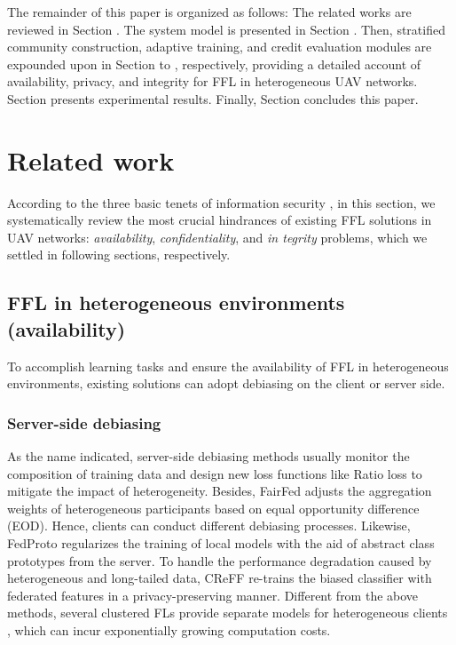 \documentclass[lettersize,journal]{IEEEtran}
\begin{document}
The remainder of this paper is organized as follows: The related works are reviewed in Section \uppercase\expandafter{}. The system model is presented in Section \uppercase\expandafter{}. Then, stratified community construction, adaptive training, and credit evaluation modules are expounded upon in Section \uppercase\expandafter{} to \uppercase\expandafter{}, respectively, providing a detailed account of availability, privacy, and integrity for FFL in heterogeneous UAV networks. Section \uppercase\expandafter{} presents experimental results. Finally, Section \uppercase\expandafter{} concludes this paper. %



\section{Related work}
According to the three basic tenets of information security \cite{zhou2021augmented-globecom}, in this section, we systematically review the most crucial hindrances of existing FFL solutions in UAV networks: \textit{availability}, \textit{confidentiality}, and \textit{in tegrity} problems, which we settled in following sections, respectively. 
\subsection{FFL in heterogeneous environments (availability)}
To accomplish learning tasks and ensure the availability of FFL in heterogeneous environments, existing solutions can adopt debiasing on the client or server side.
\subsubsection{Server-side debiasing} %
As the name indicated, server-side debiasing methods usually monitor the composition of training data and design new loss functions like Ratio loss \cite{wang2021addressing} to mitigate the impact of heterogeneity. 
Besides, FairFed \cite{ezzeldin2023fairfed} adjusts the aggregation weights of heterogeneous participants based on equal opportunity difference (EOD). Hence, clients can conduct different debiasing processes. 
Likewise, FedProto \cite{tan2022fedproto} regularizes the training of local models with the aid of abstract class prototypes from the server. 
To handle the performance degradation caused by heterogeneous and long-tailed data, CReFF\cite{shang2022federated} re-trains the biased classifier with federated features in a privacy-preserving manner. 
Different from the above methods, several clustered FLs provide separate models for heterogeneous clients \cite{sattler2020clustered-CFL}, which can incur exponentially growing computation costs.
\end{document}
